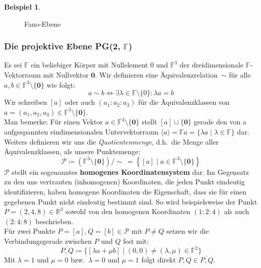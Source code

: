 \documentclass[hidelinks]{article}
\theoremstyle{plain}
\theoremstyle{definition}
\newtheorem{bsp}[thm]{Beispiel}
\theoremstyle{rem}
\newcommand{\pgtwo}{PG(2, $\mathbb{F}$)\ }
\newcommand{\fnz}{\mathbb{F}\setminus\{0\}}
\newcommand{\ftnz}{\mathbb{F}^{3}\setminus\{\boldsymbol 0\}}
\begin{document}
\begin{sloppypar}
\begin{bsp}
\begin{figure}[H]
\caption{Fano-Ebene}
\end{figure}
\end{bsp}


\subsubsection{Die projektive Ebene \pgtwo}
Es sei $\mathbb{F}$ ein beliebiger Körper mit Nullelement $0$ und $\mathbb{F}^3$ der dreidimensionale $\mathbb{F}$-Vektorraum mit Nullvektor $\boldsymbol 0$. Wir definieren eine Äquivalenzrelation~$\sim$ für alle $a,b\in\ftnz$ wie folgt:\\
\begin{equation*}
	a\sim b \Leftrightarrow \exists\lambda\in\fnz:\lambda a=b
\end{equation*}
Wir schreiben $[a]$ oder auch $(a_1:a_2:a_3)$ für die Äquivalenzklassen von $a=(a_1,a_2,a_3)\in\ftnz$.\\
Man bemerke: Für einen Vektor $a\in\ftnz$ stellt $[a]\cup\{\boldsymbol 0\}$ gerade den von a aufgespannten eindimensionalen Untervektorraum $\langle a \rangle=\mathbb{F}a=\{\lambda a\mid\lambda\in\mathbb{F}\}$ dar.\\

Weiters definieren wir uns die \textit{Quotientenmenge}, d.h.\ die Menge aller Äquivalenzklassen, als unsere Punktemenge:
\begin{equation*}
	\mathcal{P}\coloneqq(\ftnz)/\sim\ = \left \{[a]\mid a\in\ftnz\right \}
\end{equation*}
$\mathcal{P}$ stellt ein sogenanntes \textbf{homogenes Koordinatensystem} dar. Im Gegensatz zu den uns vertrauten (inhomogenen) Koordinaten, die jeden Punkt eindeutig identifizieren, haben homogene Koordinaten die Eigenschaft, dass sie für einen gegebenen Punkt nicht eindeutig bestimmt sind. So wird beispielsweise der Punkt $P=(2,4,8)\in\mathbb{R}^3$ sowohl von den homogenen Koordinaten $(1:2:4)$ als auch $(2:4:8)$ beschrieben.\\

Für zwei Punkte $P=[a],Q=[b]\in\mathcal{P}$ mit $P\ne Q$ setzen wir die Verbindungsgerade zwischen $P$ und $Q$ fest mit:
\begin{equation*}
	\overline{P,Q}\coloneqq\bigl \{[\lambda a+\mu b]\mid (0,0)\ne(\lambda,\mu)\in\mathbb{F}^2\bigr \}
\end{equation*}
Mit $\lambda=1$ und $\mu=0$ bzw.\ $\lambda=0$ und $\mu=1$ folgt direkt $P,Q\in\overline{P,Q}$.\\


\end{sloppypar}
\end{document}
